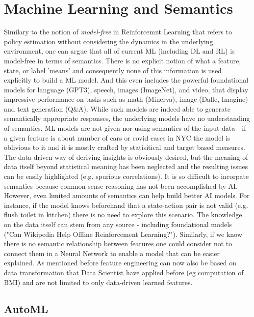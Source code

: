 \documentclass[sigconf]{acmart}
\begin{document}
\section{Machine Learning and Semantics}
\label{ml_section}
Similary to the notion of \emph{model-free} in Reinforcemnt Learning that refers to policy estimation without considering the dynamics in the underlying environment, one can argue that all of current ML (including DL and RL) is model-free in terms of semantics. There is no explicit notion of what a feature, state, or label 'means' and consequently none of this information is used explicitly to build a ML model.
And this even includes the powerful foundational models for language (GPT3), speech, images (ImageNet), and video, that display impressive performance on tasks such as math (Minerva), image (Dalle, Imagine) and text generation (Q\&A).
While such models are indeed able to generate semantically appropriate responses, the underlying models have no understanding of semantics. ML models are not given nor using semantics of the input data - if a given feature is about number of cars or covid cases in NYC the model is oblivious to it and it is mostly crafted by statisitical and target based measures. The data-driven way of deriving insights is obviously desired, but the meaning of data itself beyond statistical meaning has been neglected and the resulting issues can be easily highlighted (e.g. spurious correlations).
It is so difficult to incorpate semantics because  common-sense reasoning has not been accomplished by AI. However, even limited amounts of semantics can help build better AI models. For instance, if the model knows beforehand that a state-action pair is not valid (e.g. flush toilet in kitchen) there is no need to explore this scenario. The knowledge on the data itself can stem from any source - including foundational models ("Can Wikipedia Help Offline Reinforcement Learning?"). Similarly, if we know there is no semantic relationship between features one could consider not to connect them in a Neural Network to enable a model that can be easier explained. As mentioned before feature engineering can now also be based on data transformation that Data Scientist have applied before (eg computation of BMI) and are not limited to only data-driven learned features.

\subsection{AutoML}
\end{document}
